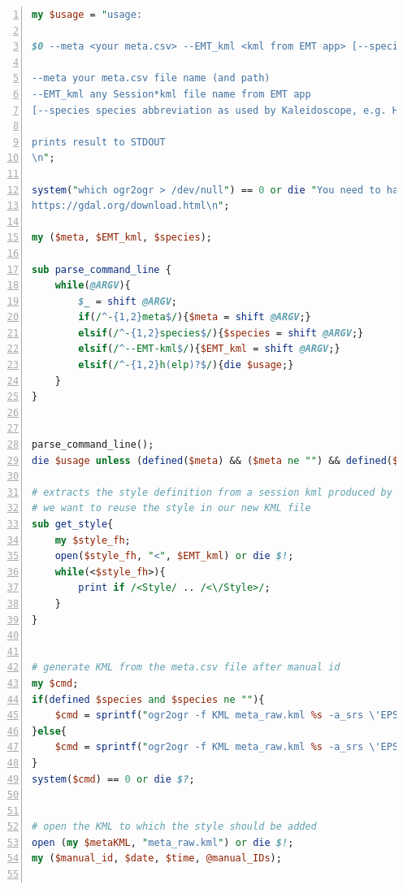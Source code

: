 \documentclass[English, 11pt, twoside, authoryear]{article}
\begin{document}
\begin{lstlisting}[language=Perl, backgroundcolor = \color{OliveGreen}, basicstyle=\small\ttfamily\color{white}, keywordstyle=\color{YellowOrange}\bfseries,
identifierstyle=\color{Cyan}\bfseries, stringstyle=\color{BrickRed}, commentstyle=\color{blue}, title=\texttt{style2kml.pl}, numbers=left, numberstyle=\color{black}]
my $usage = "usage: 

$0 --meta <your meta.csv> --EMT_kml <kml from EMT app> [--species <species abbreviation>]

--meta your meta.csv file name (and path)
--EMT_kml any Session*kml file name from EMT app 
[--species species abbreviation as used by Kaleidoscope, e.g. HYPSAV]

prints result to STDOUT
\n";

system("which ogr2ogr > /dev/null") == 0 or die "You need to have the utility ogr2ogr installed and in your PATH.
https://gdal.org/download.html\n";

my ($meta, $EMT_kml, $species);

sub parse_command_line {
    while(@ARGV){
        $_ = shift @ARGV;
        if(/^-{1,2}meta$/){$meta = shift @ARGV;}
        elsif(/^-{1,2}species$/){$species = shift @ARGV;}
        elsif(/^--EMT-kml$/){$EMT_kml = shift @ARGV;}
        elsif(/^-{1,2}h(elp)?$/){die $usage;}
    }
}


parse_command_line();
die $usage unless (defined($meta) && ($meta ne "") && defined($EMT_kml) && ($EMT_kml ne ""));

# extracts the style definition from a session kml produced by EMT app
# we want to reuse the style in our new KML file
sub get_style{
    my $style_fh;
    open($style_fh, "<", $EMT_kml) or die $!; 
    while(<$style_fh>){
        print if /<Style/ .. /<\/Style>/;
    }   
}


# generate KML from the meta.csv file after manual id
my $cmd;
if(defined $species and $species ne ""){
    $cmd = sprintf("ogr2ogr -f KML meta_raw.kml %s -a_srs \'EPSG:4326\' -oo X_POSSIBLE_NAMES=LON\* -oo Y_POSSIBLE_NAMES=LAT\* -oo KEEP_GEOM_COLUMNS=NO -where  \"\\\"MANUAL ID\\\" LIKE \'%%%s%%\'\" ", $meta, $species);
}else{
    $cmd = sprintf("ogr2ogr -f KML meta_raw.kml %s -a_srs \'EPSG:4326\' -oo X_POSSIBLE_NAMES=LON\* -oo Y_POSSIBLE_NAMES=LAT\* -oo KEEP_GEOM_COLUMNS=NO", $meta);
}
system($cmd) == 0 or die $?;


# open the KML to which the style should be added
open (my $metaKML, "meta_raw.kml") or die $!; 
my ($manual_id, $date, $time, @manual_IDs);


\end{lstlisting}
\end{document}
